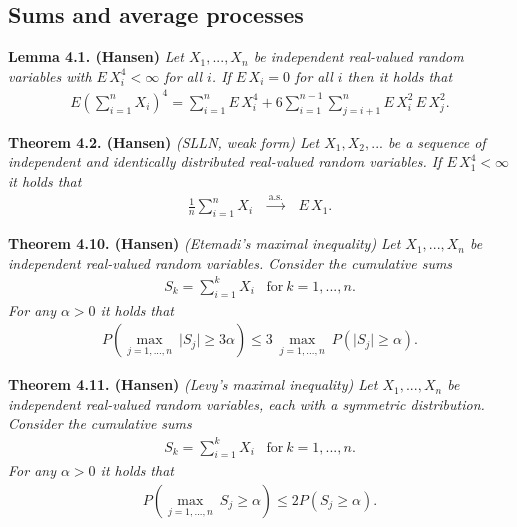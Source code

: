 \documentclass[a4paper,12pt,openany]{book}
\begin{document}
\hypertarget{sums-and-average-processes}{%
\subsection{Sums and average processes}\label{sums-and-average-processes}}

\textbf{Lemma 4.1. (Hansen)} \emph{Let \(X_1,...,X_n\) be independent real-valued random variables with \(E\, X_i^4<\infty\) for all \(i\). If \(E\, X_i=0\) for all \(i\) then it holds that}
\begin{align*}
    E\left(\sum_{i=1}^n X_i\right)^4=\sum_{i=1}^n E\, X_i^4+6\sum_{i=1}^{n-1}\sum_{j=i+1}^n E\, X_i^2\,E\,X_j^2.
\end{align*}

\textbf{Theorem 4.2. (Hansen)} \emph{(SLLN, weak form) Let \(X_1,X_2,...\) be a sequence of independent and identically distributed real-valued random variables. If \(E\, X_1^4<\infty\) it holds that}
\begin{align*}
    \frac{1}{n}\sum_{i=1}^n X_i \hspace{10pt}\stackrel{\text{a.s.}}{\to} \hspace{10pt}E\, X_1.\tag{4.3}
\end{align*}

\textbf{Theorem 4.10. (Hansen)} \emph{(Etemadi's maximal inequality) Let \(X_1,...,X_n\) be independent real-valued random variables. Consider the cumulative sums}
\begin{align*}
    S_k=\sum_{i=1}^kX_i\hspace{10pt}\text{for}\ k=1,..., n.
\end{align*}
\emph{For any \(\alpha >0\) it holds that}
\begin{align*}
    P\left(\max_{j=1,...,n}\ \vert S_j\vert\ge 3\alpha\right)\le 3\ \max_{j=1,...,n}\ P(\vert S_j\vert \ge \alpha).\tag{4.11}
\end{align*}

\textbf{Theorem 4.11. (Hansen)} \emph{(Levy's maximal inequality) Let \(X_1,...,X_n\) be independent real-valued random variables, each with a symmetric distribution. Consider the cumulative sums}
\begin{align*}
    S_k=\sum_{i=1}^kX_i\hspace{10pt}\text{for}\ k=1,..., n.
\end{align*}
\emph{For any \(\alpha>0\) it holds that}
\begin{align*}
    P\left(\max_{j=1,...,n}\ S_j\ge \alpha\right)\le 2 P(S_j\ge \alpha).\tag{4.13}
\end{align*}
\end{document}
